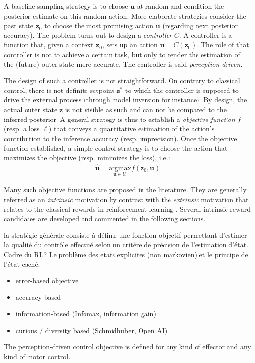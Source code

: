 \documentclass[12pt,twoside,openright]{article}
\begin{document}
A baseline sampling strategy is to choose $\boldsymbol{u}$ at random and condition the posterior  estimate on this random action. 
More elaborate strategies consider the past state $\boldsymbol{z}_0$ to choose the most promising action $\boldsymbol{u}$ (regarding next posterior accuracy). The problem turns out to design  a \emph{controller} $C$. A controller is a function that, given a context $\boldsymbol{z}_0$, sets up an action $\boldsymbol{u} = C(\boldsymbol{z}_0)$. The role of that controller is not to achieve a certain task, but only to render the estimation of the (future) outer state more accurate. The controller is said \emph{perception-driven}. 

The design of such a controller is not straightforward. On contrary to classical control, there is not definite setpoint $\boldsymbol{z}^*$ to which the controller is supposed to drive the external process (through model inversion for instance). By design, the actual outer state $\boldsymbol{z}$ is not visible as such and can not be compared to the inferred posterior. A general strategy is thus to establish a \emph{objective function} $f$ (resp. a loss $\ell$) that conveys a quantitative estimation of the action's contribution to the inference accuracy (resp. imprecision). Once the objective function established, a simple control strategy is to choose the action that maximizes the objective (resp. minimizes the loss), i.e.:
\begin{align}
\hat{\boldsymbol{u}} = \underset{\boldsymbol{u}\in\mathcal{U}}{\text{argmax}}  f(\boldsymbol{z}_0, \boldsymbol{u})
\end{align}

Many such objective functions are proposed in the literature. They are generally referred as an \emph{intrinsic} motivation by contrast with the \emph{extrinsic} motivation that relates to the classical rewards in reinforcement learning \cite{sutton1998reinforcement}. Several intrinsic reward candidates are developed and commented in the following sections.

{\color{magenta} la stratégie générale consiste à définir une fonction objectif permettant d'estimer la qualité du contrôle effectué selon un critère de précision de l'estimation d'état. Cadre du RL? Le problème des etats explicites (non markovien) et le principe de l'état caché.}

{\color{blue} 
	\begin{itemize}
		\item error-based objective
		\item accuracy-based
		\item information-based (Infomax, information gain)
		\item curious / diversity based  (Schmidhuber, Open AI)
	\end{itemize}
	
	
	The perception-driven control objective is defined for any kind of effector and any kind of motor control.} 
\end{document}
